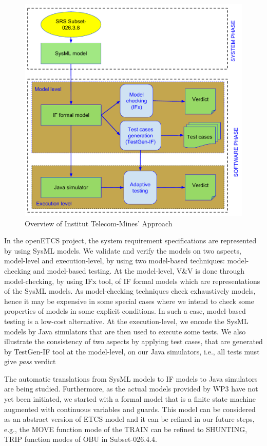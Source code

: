 \documentclass{template/openetcs_article}
\begin{document}
\begin{figure}[!htbp]
\begin{center}
  \includegraphics[width=.7\textwidth]{figures/TSP-approach.pdf}
  \caption{Overview of Institut Telecom-Mines' Approach}
  \label{fig:approach}
\end{center}
\end{figure}


In the openETCS project, the system requirement specifications are represented
by using SysML models. We validate and verify the models on two aspects,
model-level and execution-level, by using two model-based techniques:
model-checking and model-based testing.
At the model-level, V\&V is done through model-checking, by using IFx tool, of
IF formal models which are representations of the SysML models.
As model-checking techniques check exhaustively models, hence it may be
expensive in some special cases where we intend to check some properties of
models in some explicit conditions.
In such a case, model-based testing is a low-cost alternative.
At the execution-level, we encode the SysML models by Java simulators that are
then used to execute some tests.
We also illustrate the consistency of two aspects by applying test cases, that
are generated by TestGen-IF tool at the model-level, on our Java simulators,
i.e., all tests must give {\em pass} verdict

The automatic translations from SysML models to IF models to Java simulators are
being studied. Furthermore, as the actual models provided by WP3 have not yet
been initiated, we started with a formal model that is a finite state machine
augmented with continuous variables and guards. This model can be considered as
an abstract version of ETCS model and it can be refined in our future steps,
e.g., the MOVE function mode of the TRAIN can be refined to SHUNTING,
TRIP function modes of OBU in Subset-026.4.4.
\end{document}
